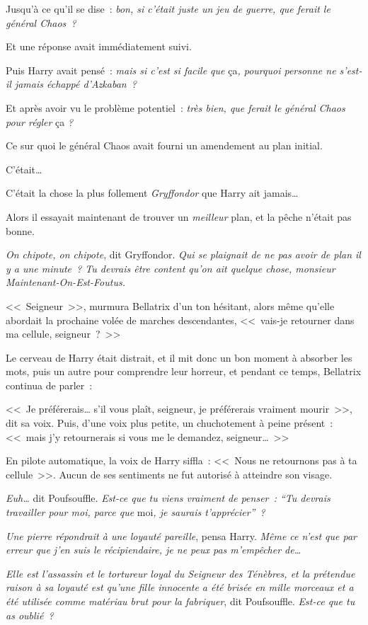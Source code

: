Jusqu'à ce qu'il se dise~: \emph{bon, si c'était juste un jeu de guerre, que ferait le général Chaos~?}

Et une réponse avait immédiatement suivi.

Puis Harry avait pensé~: \emph{mais si c'est si facile que} ça\emph{, pourquoi personne ne s'est-il jamais échappé d'Azkaban~?}

Et après avoir vu le problème potentiel~: \emph{très bien, que ferait le général Chaos pour régler} ça \emph{?}

Ce sur quoi le général Chaos avait fourni un amendement au plan initial.

C'était…

C'était la chose la plus follement \emph{Gryffondor} que Harry ait jamais…

Alors il essayait maintenant de trouver un \emph{meilleur} plan, et la pêche n'était pas bonne.

\emph{On chipote, on chipote}, dit Gryffondor. \emph{Qui se plaignait de ne pas avoir de plan il y a une minute~? Tu devrais être content qu'on ait quelque chose, monsieur Maintenant-On-Est-Foutus.}

<<~Seigneur~>>, murmura Bellatrix d'un ton hésitant, alors même qu'elle abordait la prochaine volée de marches descendantes, <<~vais-je retourner dans ma cellule, seigneur~?~>>

Le cerveau de Harry était distrait, et il mit donc un bon moment à absorber les mots, puis un autre pour comprendre leur horreur, et pendant ce temps, Bellatrix continua de parler~:

<<~Je préférerais… s'il vous plaît, seigneur, je préférerais vraiment mourir~>>, dit sa voix. Puis, d'une voix plus petite, un chuchotement à peine présent~: <<~mais j'y retournerais si vous me le demandez, seigneur…~>>

En pilote automatique, la voix de Harry siffla~: <<~Nous ne retournons pas à ta cellule~>>. Aucun de ses sentiments ne fut autorisé à atteindre son visage.

\emph{Euh…} dit Poufsouffle. \emph{Est-ce que tu viens vraiment de penser~: “Tu devrais travailler pour moi, parce que} moi\emph{, je saurais t'apprécier”~?}

\emph{Une pierre répondrait à une loyauté pareille}, pensa Harry. \emph{Même ce n'est que par erreur que j'en suis le récipiendaire, je ne peux pas m'empêcher de…}

\emph{Elle est l'assassin et le tortureur loyal du Seigneur des Ténèbres, et la prétendue raison à sa loyauté est qu'une fille innocente a été brisée en mille morceaux et a été utilisée comme matériau brut pour la fabriquer}, dit Poufsouffle. \emph{Est-ce que tu as oublié~?}

